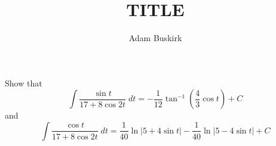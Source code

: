 \documentclass{article}
\title{TITLE}
\author{Adam Buskirk}
\theoremstyle{definition}
\newcommand{\p}[1]{\left(#1\right)}
\newcommand{\abs}[1]{\left|#1\right|}
\begin{document}
\maketitle

Show that 
\[
\int \frac{\sin t}{17+8 \cos 2 t} \;dt = -\frac{1}{12} \tan^{-1}\p{\frac{4}{3} \cos t} + C
\]
and
\[
\int \frac{\cos t}{17+8 \cos 2t} \;dt 
= \frac{1}{40} \ln \abs{5+4\sin t} - \frac{1}{40} \ln\abs{5-4\sin t} + C
\]
\end{document}

